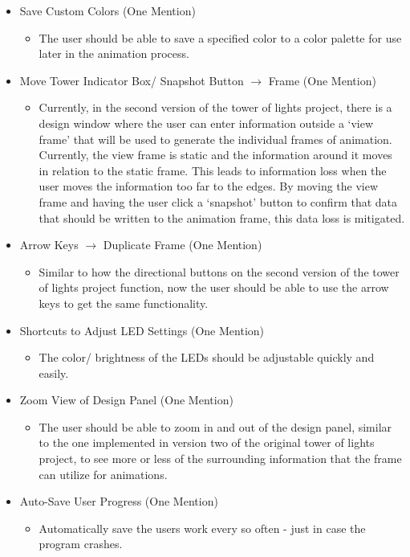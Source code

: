 \documentclass[./spec.tex]{subfiles}
\begin{document}
{\begin{itemize}
\begin{itemize}
	\end{itemize}
	\item Save Custom Colors (One Mention)
	\begin{itemize}
		\item The user should be able to save a specified color to a color palette for use later in the animation process.
	\end{itemize}
	\item Move Tower Indicator Box/ Snapshot Button $\rightarrow$ Frame (One Mention)
	\begin{itemize}
		\item Currently, in the second version of the tower of lights project, there is a design window where the user can enter information outside a `view frame' that will be used to generate the individual frames of animation. Currently, the view frame is static and the information around it moves in relation to the static frame. This leads to information loss when the user moves the information too far to the edges. By moving the view frame and having the user click a `snapshot' button to confirm that data that should be written to the animation frame, this data loss is mitigated.
	\end{itemize}
	\item Arrow Keys $\rightarrow$ Duplicate Frame (One Mention)
	\begin{itemize}
		\item Similar to how the directional buttons on the second version of the tower of lights project function, now the user should be able to use the arrow keys to get the same functionality.
	\end{itemize}
	\item Shortcuts to Adjust LED Settings (One Mention)
	\begin{itemize}
		\item The color/ brightness of the LEDs should be adjustable quickly and easily.
	\end{itemize}
	\item Zoom View of Design Panel (One Mention)
	\begin{itemize}
		\item The user should be able to zoom in and out of the design panel, similar to the one implemented in version two of the original tower of lights project, to see more or less of the surrounding information that the frame can utilize for animations. 
	\end{itemize}
	\item Auto-Save User Progress (One Mention)
	\begin{itemize}
		\item Automatically save the users work every so often - just in case the program crashes.
	\end{itemize}
\end{itemize}}
\end{document}
